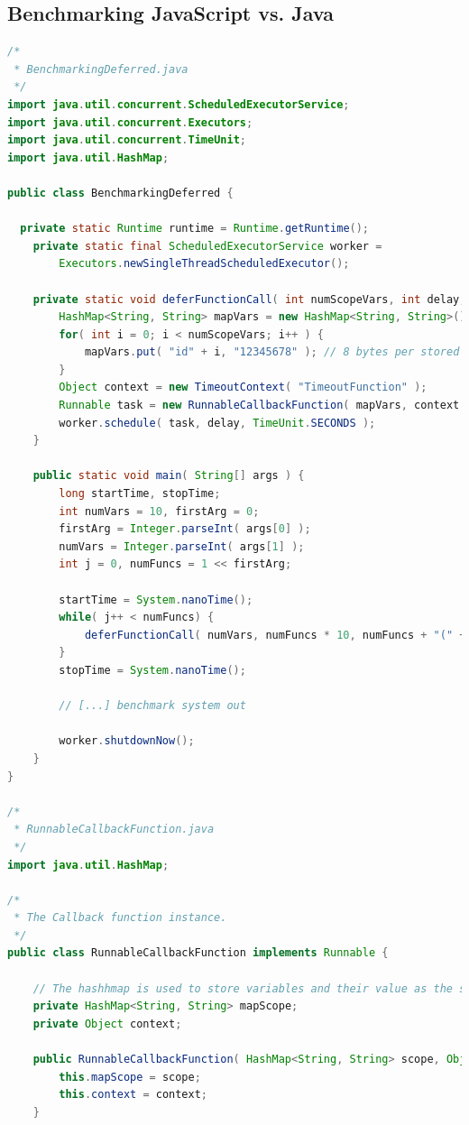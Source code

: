 

\subsection{Benchmarking JavaScript vs. Java}

\begin{lstlisting}[frame=single,label=lst_bm_java,language=Java,caption=Closure Benchmarking: Java Code]
/*
 * BenchmarkingDeferred.java
 */
import java.util.concurrent.ScheduledExecutorService;
import java.util.concurrent.Executors;
import java.util.concurrent.TimeUnit;
import java.util.HashMap;

public class BenchmarkingDeferred {

  private static Runtime runtime = Runtime.getRuntime();
	private static final ScheduledExecutorService worker = 
		Executors.newSingleThreadScheduledExecutor();

	private static void deferFunctionCall( int numScopeVars, int delay, String scopeId ) {
		HashMap<String, String> mapVars = new HashMap<String, String>();
		for( int i = 0; i < numScopeVars; i++ ) {
			mapVars.put( "id" + i, "12345678" ); // 8 bytes per stored scope variable
		}
		Object context = new TimeoutContext( "TimeoutFunction" );
		Runnable task = new RunnableCallbackFunction( mapVars, context );
		worker.schedule( task, delay, TimeUnit.SECONDS );
	}

	public static void main( String[] args ) {
		long startTime, stopTime;
		int numVars = 10, firstArg = 0;
		firstArg = Integer.parseInt( args[0] );
		numVars = Integer.parseInt( args[1] );
		int j = 0, numFuncs = 1 << firstArg;

		startTime = System.nanoTime();
		while( j++ < numFuncs) {
			deferFunctionCall( numVars, numFuncs * 10, numFuncs + "(" + j + ")" );
		}
		stopTime = System.nanoTime();

		// [...] benchmark system out

		worker.shutdownNow();
	}
}

/*
 * RunnableCallbackFunction.java
 */
import java.util.HashMap;

/*
 * The Callback function instance.
 */
public class RunnableCallbackFunction implements Runnable {
	
	// The hashhmap is used to store variables and their value as the scope
	private HashMap<String, String> mapScope;
	private Object context;

	public RunnableCallbackFunction( HashMap<String, String> scope, Object context ) {
		this.mapScope = scope;
		this.context = context;
	}


\end{lstlisting}
